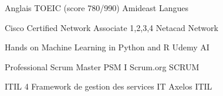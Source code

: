 


\begin{cvhonors}

  \cvhonor
    {} %
    {\hspace{1mm} Anglais TOEIC (score 780/990)} %
    {Amideast} %
    {Langues} %

  \cvhonor
    {} %
    {\hspace{1mm} Cisco Certified Network Associate 1,2,3,4 } %
    {Netacad} %
    {Network} %

  \cvhonor
    {} %
    {\hspace{1mm}Hands on Machine Learning in Python and R} %
    {Udemy} %
    {AI} %

  \cvhonor
    {} %
    {\hspace{1mm}Professional Scrum Master PSM I } %
    {Scrum.org} %
    {SCRUM} %

  \cvhonor
    {} %
    {\hspace{1mm}ITIL 4 Framework de gestion des services IT } %
    {Axelos} %
    {ITIL} %

\end{cvhonors}


